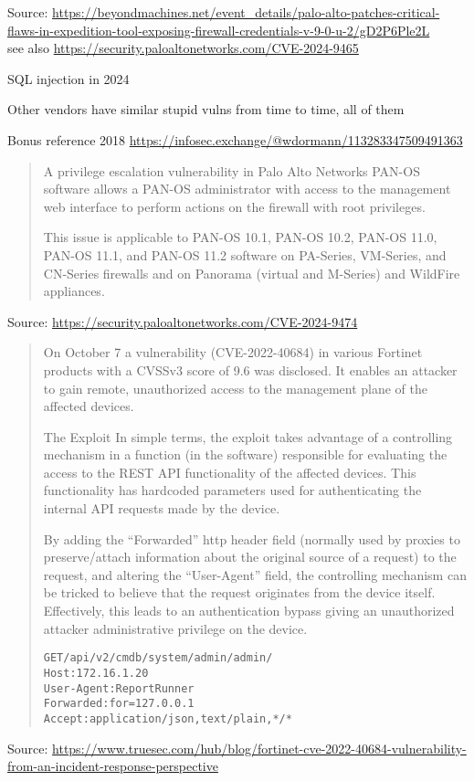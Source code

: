 \documentclass[Screen16to9,17pt]{foils}
\begin{document}
Source: {\footnotesize
\url{https://beyondmachines.net/event_details/palo-alto-patches-critical-flaws-in-expedition-tool-exposing-firewall-credentials-v-9-0-u-2/gD2P6Ple2L}\\ see also
\url{https://security.paloaltonetworks.com/CVE-2024-9465}}

\begin{list2}
\item SQL injection in 2024
\item Other vendors have similar stupid vulns from time to time, all of them
\item Bonus reference 2018 \url{https://infosec.exchange/@wdormann/113283347509491363}
\end{list2}


\begin{quote}
A privilege escalation vulnerability in Palo Alto Networks PAN-OS software allows a PAN-OS administrator
with access to the management web interface to perform actions on the firewall with root privileges.

This issue is applicable to PAN-OS 10.1, PAN-OS 10.2, PAN-OS 11.0, PAN-OS 11.1, and PAN-OS 11.2
software on PA-Series, VM-Series, and CN-Series firewalls and on Panorama (virtual and M-Series) and WildFire
appliances.
\end{quote}
Source: \url{https://security.paloaltonetworks.com/CVE-2024-9474}



\begin{quote}\small
On October 7 a vulnerability (CVE-2022-40684) in various Fortinet products with a CVSSv3 score of 9.6 was disclosed. It enables an attacker to gain remote, unauthorized access to the management plane of the affected devices.

The Exploit
In simple terms, the exploit takes advantage of a controlling mechanism in a function (in the software) responsible for evaluating the access to the REST API functionality of the affected devices. This functionality has hardcoded parameters used for authenticating the internal API requests made by the device.

By adding the “Forwarded” http header field (normally used by proxies to preserve/attach information about the original source of a request) to the request, and altering the “User-Agent” field, the controlling mechanism can be tricked to believe that the request originates from the device itself. Effectively, this leads to an authentication bypass giving an unauthorized attacker administrative privilege on the device.

\begin{alltt}
GET /api/v2/cmdb/system/admin/admin/
Host: 172.16.1.20
User-Agent: Report Runner
Forwarded: for=127.0.0.1
Accept: application/json, text/plain, */*
\end{alltt}
\end{quote}
Source: {\scriptsize\url{https://www.truesec.com/hub/blog/fortinet-cve-2022-40684-vulnerability-from-an-incident-response-perspective}}
\end{document}

